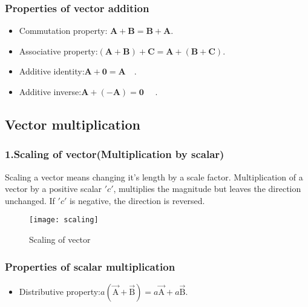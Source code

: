 \subsubsection{Properties of vector addition}
\begin{itemize}
	\item Commutation property:
	$\mathbf{A}+\mathbf{B}=\mathbf{B}+\mathbf{A}$.
	\item Associative property:$(\mathbf{A}+\mathbf{B})+\mathbf{C}=\mathbf{A}+(\mathbf{B}+\mathbf{C})$.
	\item Additive identity:$\mathbf{A}+\mathbf{0}=\mathbf{A} \quad$.
	\item Additive inverse:$\mathbf{A}+(-\mathbf{A})=\mathbf{0} \quad$ .
	
\end{itemize}
\subsection{Vector  multiplication}
\subsubsection{\large{1}.{Scaling of vector}(Multiplication by scalar)}
Scaling a vector means changing it's length by a scale factor.	Multiplication of a vector by a positive scalar $'c'$, multiplies the magnitude but leaves the
direction unchanged. If $'c'$ is negative, the direction is reversed.
\begin{figure}[H]
	\begin{center}
		\texttt{[image: scaling]}
	\end{center}
\caption{Scaling of vector}
\end{figure}
\subsubsection{Properties of scalar multiplication}
\begin{itemize}
	\item  Distributive property:\quad$a(\vec{\mathrm A}+\vec{\mathrm B})=a \vec{\mathrm A}+a \vec{\mathrm B}$.
\end{itemize}
